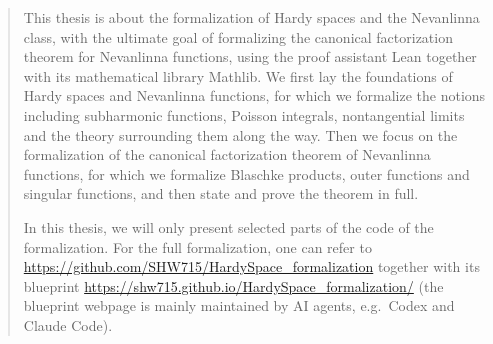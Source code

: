 
\begin{abstract}
This thesis is about the formalization of Hardy spaces and the Nevanlinna
class, with the ultimate goal of formalizing the canonical factorization
theorem for Nevanlinna functions, using the proof assistant Lean
together with its mathematical library Mathlib. We first lay the
foundations of Hardy spaces and Nevanlinna functions, for which we
formalize the notions including subharmonic functions, Poisson integrals,
nontangential limits and the theory surrounding them along the way. Then we
focus on the formalization of the canonical factorization theorem of
Nevanlinna functions, for which we formalize Blaschke products, outer functions
and singular functions, and then state and prove the theorem in full.

In this thesis, we will only present selected parts of the code of the formalization.
For the full formalization, one can refer to
\url{https://github.com/SHW715/HardySpace_formalization} together with its blueprint
\url{https://shw715.github.io/HardySpace_formalization/} (the blueprint webpage is mainly
maintained by AI agents, e.g.\ Codex and Claude Code).
\end{abstract}
